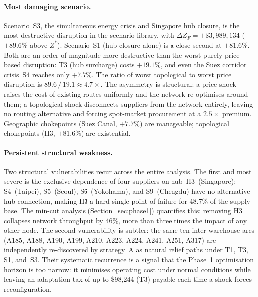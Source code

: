  
\paragraph{Most damaging scenario.}
Scenario~S3, the simultaneous energy crisis and Singapore hub
closure,  is the most destructive disruption in the scenario
library, with $\Delta Z_F = +\$3{,}989{,}134$ ($+89.6\%$ above
$Z^*$). Scenario~S1 (hub closure alone) is a close second at
$+81.6\%$. Both are an order of magnitude more destructive than
the worst purely price-based disruption: T3 (hub surcharge)
costs $+19.1\%$, and even the Suez corridor crisis~S4 reaches
only $+7.7\%$. The ratio of worst topological to worst price
disruption is $89.6\,/\,19.1 \approx 4.7\times$. The asymmetry
is structural: a price shock raises the cost of existing routes
uniformly and the network re-optimises around them; a topological
shock disconnects suppliers from the network entirely, leaving
no routing alternative and forcing spot-market procurement at
a $2.5\times$ premium. Geographic chokepoints (Suez Canal,
$+7.7\%$) are manageable; topological chokepoints (H3,
$+81.6\%$) are existential.
 
\paragraph{Persistent structural weakness.}
Two structural vulnerabilities recur across the entire analysis.
The first and most severe is the exclusive dependence of
four suppliers on hub~H3~(Singapore): S4~(Taipei),
S5~(Seoul), S6~(Yokohama), and S9~(Chengdu) have no alternative
hub connection, making H3 a hard single point of failure for
48.7\% of the supply base. The min-cut analysis
(Section~\ref{sec:phase1}) quantifies this: removing H3 collapses
network throughput by 46\%, more than three times the impact of
any other node. The second vulnerability is subtler: the same
ten inter-warehouse arcs (A185, A188, A190, A199, A210, A223,
A224, A241, A251, A317) are independently re-discovered by
strategy~A as natural relief paths under T1, T3, S1, and~S3.
Their systematic recurrence is a signal that the Phase~1
optimisation horizon is too narrow: it minimises operating cost
under normal conditions while leaving an adaptation tax of up to
\$98{,}244 (T3) payable each time a shock forces reconfiguration.
 
